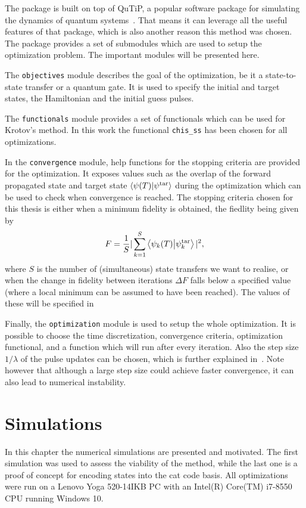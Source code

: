 \documentclass[main.tex]{subfiles}
\begin{document}
The package is built on top of QuTiP, a popular software package for simulating the dynamics of quantum systems~\cite{johansson_qutip_2013}.
That means it can leverage all the useful features of that package, which is also another reason this method was chosen.
The package provides a set of submodules which are used to setup the optimization problem.
The important modules will be presented here.

The \texttt{objectives} module describes the goal of the optimization, be it a state-to-state transfer or a quantum gate.
It is used to specify the initial and target states, the Hamiltonian and the initial guess pulses.

The \texttt{functionals} module provides a set of functionals which can be used for Krotov's method.
In this work the functional \texttt{chis\_ss} has been chosen for all optimizations.

In the \texttt{convergence} module, help functions for the stopping criteria are provided for the optimization.
It exposes values such as the overlap of the forward propagated state and target state \(\braket{\psi(T)}{\psi^{\text{tar}}}\) during the optimization which can be used to check when convergence is reached.
The stopping criteria chosen for this thesis is either when a minimum fidelity is obtained, the fiedlity being given by~\cite{ofek_extending_2016}
\begin{equation}
    F = \frac{1}{S}|\sum_{k=1}^{S} \braket{\psi_k(T)}{\psi_{k}^{\text{tar}}}|^2,
    \label{eq:total-fidelity}
\end{equation}
where \(S\) is the number of (simultaneous) state transfers we want to realise, or when the change in fidelity between iterations \(\Delta F\) falls below a specified value (where a local minimum can be assumed to have been reached).
The values of these will be specified in~

Finally, the \texttt{optimization} module is used to setup the whole optimization.
It is possible to choose the time discretization, convergence criteria, optimization functional, and a function which will run after every iteration.
Also the step size \(1/\lambda\) of the pulse updates can be chosen, which is further explained in~\cite{goerz_krotov:_2019}.
Note however that although a large step size could achieve faster convergence, it can also lead to numerical instability.

\section{Simulations}
\label{sec:optimization-simulations}
In this chapter the numerical simulations are presented and motivated.
The first simulation was used to assess the viability of the method, while the last one is a proof of concept for encoding states into the cat code basis.
All optimizations were run on a Lenovo Yoga 520-14IKB PC with an Intel(R) Core(TM) i7-8550 CPU running Windows 10.
\end{document}
